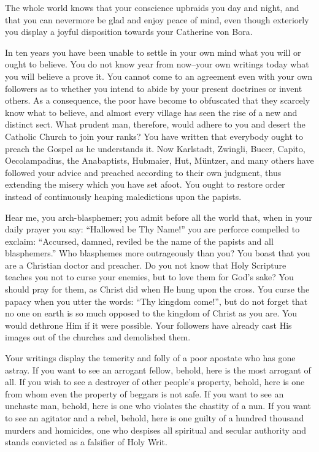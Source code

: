 The whole world knows that your conscience upbraids you day and night,
and that you can nevermore be glad and enjoy peace of mind, even though
exteriorly you display a joyful disposition towards your Catherine von Bora.

In ten years you have been unable to settle in your own mind what you
will or ought to believe. You do not know year from now--your own writings
today what you will believe a prove it. You cannot come to an agreement
even with your own followers as to whether you intend to abide by
your present doctrines or invent others. As a consequence, the poor have
become to obfuscated that they scarcely know what to believe, and
almost every village has seen the rise of a new and distinct sect. What
prudent man, therefore, would adhere to you and desert the Catholic Church to
join your ranks? You have written that everybody ought to preach the
Gospel as he understands it. Now Karlstadt, Zwingli, Bucer, Capito,
Oecolampadius, the Anabaptists, Hubmaier, Hut, Müntzer, and many
others have followed your advice and preached according to their own judgment, thus
extending the misery which you have set afoot. You ought to restore order
instead of continuously heaping maledictions upon the papists.

Hear me, you arch-blasphemer; you admit before all the world that, when
in your daily prayer you say: “Hallowed be Thy Name!” you are perforce
compelled to exclaim: “Accursed, damned, reviled be the name of the papists
and all blasphemers.” Who blasphemes more outrageously than you? You
boast that you are a Christian doctor and preacher. Do you not know that
Holy Scripture teaches you not to curse your enemies, but to love them for
God’s sake? You should pray for them, as Christ did when He hung upon the
cross. You curse the papacy when you utter the words: “Thy kingdom
come!”, but do not forget that no one on earth is so much opposed to the
kingdom of Christ as you are. You would dethrone Him if it were possible.
Your followers have already cast His images out of the churches and demolished
them.

Your writings display the temerity and folly of a poor apostate who has
gone astray. If you want to see an arrogant fellow, behold, here is the most
arrogant of all. If you wish to see a destroyer of other people’s property,
behold, here is one from whom even the property of beggars is not safe. If you
want to see an unchaste man, behold, here is one who violates the chastity of
a nun. If you want to see an agitator and a rebel, behold, here is one guilty
of a hundred thousand murders and homicides, one who despises all spiritual
and secular authority and stands convicted as a falsifier of Holy Writ.

